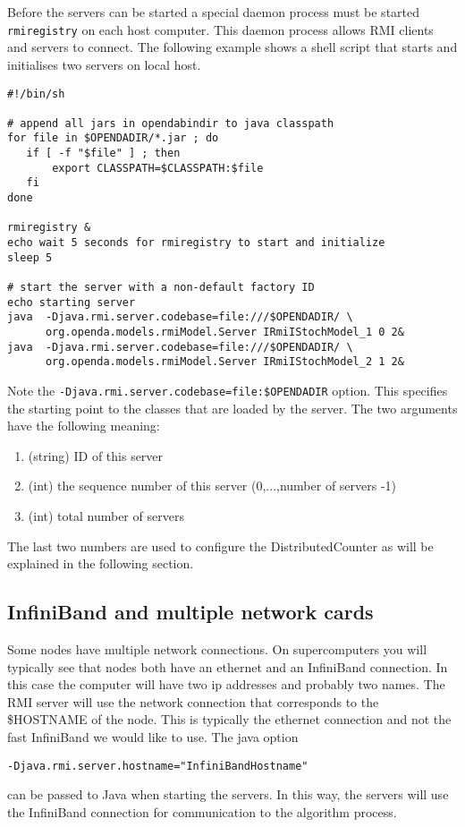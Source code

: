 Before the servers can be started a special daemon process must be started {\tt
  rmiregistry} on each host computer. This daemon process allows RMI clients
and servers to connect. The following example shows a shell script that starts
and initialises two servers on local host. {\small
\begin{verbatim}
#!/bin/sh

# append all jars in opendabindir to java classpath
for file in $OPENDADIR/*.jar ; do
   if [ -f "$file" ] ; then
       export CLASSPATH=$CLASSPATH:$file
   fi
done

rmiregistry &
echo wait 5 seconds for rmiregistry to start and initialize
sleep 5

# start the server with a non-default factory ID
echo starting server
java  -Djava.rmi.server.codebase=file:///$OPENDADIR/ \
      org.openda.models.rmiModel.Server IRmiIStochModel_1 0 2&
java  -Djava.rmi.server.codebase=file:///$OPENDADIR/ \
      org.openda.models.rmiModel.Server IRmiIStochModel_2 1 2&
\end{verbatim}
} Note the {\tt -Djava.rmi.server.codebase=file:\/\/\/\$OPENDADIR} option. This
specifies the starting point to the classes that are loaded by the server. The
two arguments have the following meaning:
\begin{enumerate}
\item (string) ID of this server
\item (int) the sequence number of this server (0,...,number of servers -1)
\item (int) total number of servers
\end{enumerate}
The last two numbers are used to configure the DistributedCounter as will be
explained in the following section.

\subsection{InfiniBand and multiple network cards}
Some nodes have multiple network connections. On supercomputers you will
typically see that nodes both have an ethernet and an InfiniBand connection. In
this case the computer will have two ip addresses and probably two names. The
RMI server will use the network connection that corresponds to the \$HOSTNAME
of the node. This is typically the ethernet connection and not the fast
InfiniBand we would like to use. The java option
\begin{verbatim}
-Djava.rmi.server.hostname="InfiniBandHostname"
\end{verbatim}
can be passed to Java when starting the servers. In this way, the servers will
use the InfiniBand connection for communication to the algorithm process.


